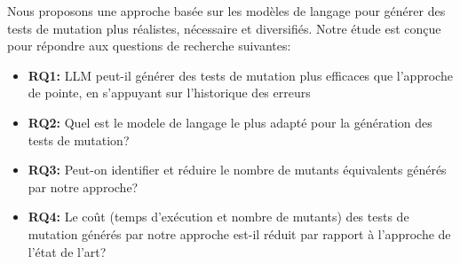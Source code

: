 Nous proposons une approche basée sur les modèles
de langage pour générer des tests de mutation plus réalistes, nécessaire et
diversifiés. Notre étude est conçue pour répondre aux questions de
recherche suivantes:

\begin{itemize}
    \item \textbf{RQ1:} LLM peut-il générer des tests de mutation plus efficaces que l'approche de pointe, en s'appuyant sur l'historique des erreurs

    \item \textbf{RQ2:} Quel est le modele de langage le plus adapté pour la génération des tests de mutation?

    \item \textbf{RQ3:} Peut-on identifier et réduire le nombre de mutants équivalents générés par notre approche?

    \item \textbf{RQ4:} Le coût (temps d'exécution et nombre de mutants) des tests de mutation générés par notre approche est-il réduit par rapport à l'approche de l'état de l'art?

\end{itemize}

